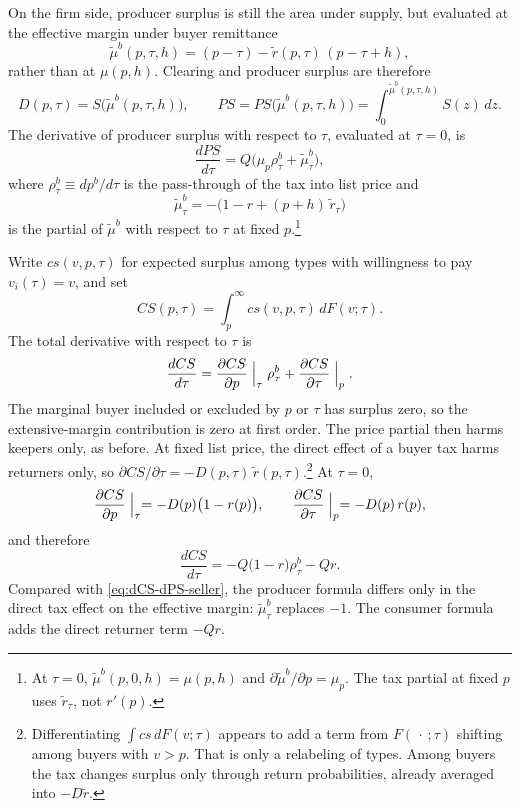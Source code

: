 \documentclass[11pt]{article}
\begin{document}
On the firm side, producer surplus is still the area under supply, but
evaluated at the effective margin under buyer remittance
\begin{equation}
  \tilde{\mu}^{b}(p,\tau,h)
  =(p-\tau)-\tilde{r}(p,\tau)\,(p-\tau+h),
  \label{eq:mu-tilde}
\end{equation}
rather than at $\mu(p,h)$.  Clearing and producer surplus are therefore
\begin{equation}
  D(p,\tau)=S\bigl(\tilde{\mu}^{b}(p,\tau,h)\bigr),
  \qquad
  PS=PS\bigl(\tilde{\mu}^{b}(p,\tau,h)\bigr)
  =\int_0^{\tilde{\mu}^{b}(p,\tau,h)}S(z)\,dz.
  \label{eq:clear-buyer}
\end{equation}
The derivative of producer surplus with respect to $\tau$, evaluated at
$\tau=0$, is
\begin{equation}
  \frac{dPS}{d\tau}
  =Q\bigl(\mu_p\rho^{b}_{\tau}+\tilde{\mu}^{b}_{\tau}\bigr),
  \label{eq:dPS-buyer}
\end{equation}
where $\rho^{b}_{\tau}\equiv dp^{b}/d\tau$ is the pass-through of the tax into
list price and
\begin{equation}
  \tilde{\mu}^{b}_{\tau}
  =-\bigl(1-r+(p+h)\,\tilde{r}_{\tau}\bigr)
\end{equation}
is the partial of $\tilde{\mu}^{b}$ with respect to $\tau$ at fixed
$p$.\footnote{At $\tau=0$, $\tilde{\mu}^{b}(p,0,h)=\mu(p,h)$ and
  $\partial\tilde{\mu}^{b}/\partial p=\mu_p$.  The tax partial at fixed $p$
  uses $\tilde{r}_{\tau}$, not $r'(p)$.}

Write $cs(v,p,\tau)$ for expected surplus among types with willingness to pay
$v_i(\tau)=v$, and set
\begin{equation}
  CS(p,\tau)
  =\int_p^\infty cs(v,p,\tau)\,dF(v;\tau).
\end{equation}
The total derivative with respect to $\tau$ is
\[
  \frac{dCS}{d\tau}
  =\frac{\partial CS}{\partial p}\Bigm|_{\tau}\rho^{b}_{\tau}
  +\frac{\partial CS}{\partial \tau}\Bigm|_{p}.
\]
The marginal buyer included or excluded by $p$ or $\tau$ has surplus
zero, so the extensive-margin contribution is zero at first order.  The
price partial then harms keepers only, as before.  At fixed list
price, the direct effect of a buyer tax harms returners only, so
$\partial CS/\partial\tau=-D(p,\tau)\,\tilde{r}(p,\tau)$.\footnote{Differentiating
  $\int cs\,dF(v;\tau)$ appears to add a term from $F(\,\cdot\,;\tau)$ shifting
  among buyers with $v>p$.  That is only a relabeling of types.  Among buyers
  the tax changes surplus only through return probabilities, already averaged
  into $-D\tilde{r}$.}
At $\tau=0$,
\begin{equation}
  \frac{\partial CS}{\partial p}\Bigm|_{\tau}
  =-D(p)\bigl(1-r(p)\bigr),
  \qquad
  \frac{\partial CS}{\partial \tau}\Bigm|_{p}
  =-D(p)\,r(p),
\end{equation}
and therefore
\begin{equation}
  \frac{dCS}{d\tau}
  =-Q\bigl(1-r\bigr)\rho^{b}_{\tau}-Qr.
  \label{eq:dCS-buyer}
\end{equation}
Compared with \eqref{eq:dCS-dPS-seller}, the producer formula differs only in
the direct tax effect on the effective margin:
$\tilde{\mu}^{b}_{\tau}$ replaces $-1$.  The consumer formula adds the
direct returner term $-Qr$.
\end{document}
